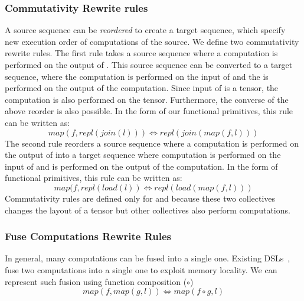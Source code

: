 
\subsubsection{Commutativity Rewrite rules} 
A source sequence can be \emph{reordered} to create a target sequence, which specify new execution order of computations of the source.
We define two commutativity rewrite rules.
The first rule takes a source sequence where a computation is performed on the output of \allgather.
This source sequence can be converted to a target sequence, where the computation is performed on the input of \allgather and the \allgather is performed on the output of the computation.
Since input of \allgather is a \sliced tensor, the computation is also performed on the \sliced tensor.
Furthermore, the converse of the above reorder is also possible.
In the form of our functional primitives, this rule can be written as:
\[
  map(f, repl(join(l))) \iff repl(join(map(f, l)))
\]
The second rule reorders a source sequence where a computation is performed on the output of \broadcast into a target sequence where computation is performed on the input of \broadcast and \broadcast is performed on the output of the computation.
In the form of functional primitives, this rule can be written as:
\[
  map(f, repl(load(l)) \iff repl(load(map(f, l)))
\]
Commutativity rules are defined only for \allgather and \broadcast because these two 
collectives changes the layout of a tensor but other collectives also perform computations.

\subsubsection{Fuse Computations Rewrite Rules}
In general, many computations can be fused into a single one.
Existing DSLs~\cite{halide,lift-cgo17,lift-cgo18,distributed-halide}, fuse two computations into a single one to exploit memory locality.
We can represent such fusion using function composition ($\circ$)
\[
  map(f, map(g, l)) \iff map(f \circ g, l)
\]

